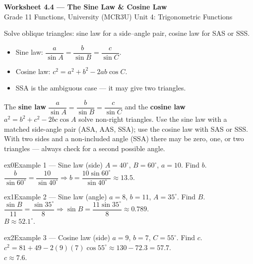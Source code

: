 \documentclass[11pt]{article}
\begin{document}
\begin{center}
{\LARGE\bfseries\color{titleblue}Worksheet 4.4 --- The Sine Law \& Cosine Law}\\[2pt]
{\small Grade 11 Functions, University (MCR3U) \textperiodcentered{} Unit 4: Trigonometric Functions}
\end{center}

\begin{ideabox}
Solve oblique triangles: sine law for a side–angle pair, cosine law for SAS or SSS.
\begin{itemize}[leftmargin=*,itemsep=2pt]
  \item Sine law: $\dfrac{a}{\sin A}=\dfrac{b}{\sin B}=\dfrac{c}{\sin C}$.
  \item Cosine law: $c^2=a^2+b^2-2ab\cos C$.
  \item SSA is the ambiguous case — it may give two triangles.
\end{itemize}
\end{ideabox}

\begin{learnbox}
The \textbf{sine law} $\dfrac{a}{\sin A}=\dfrac{b}{\sin B}=\dfrac{c}{\sin C}$ and the \textbf{cosine law} $a^2=b^2+c^2-2bc\cos A$ solve non-right triangles.
Use the sine law with a matched side-angle pair (ASA, AAS, SSA); use the cosine law with SAS or SSS.
With two sides and a non-included angle (SSA) there may be zero, one, or two triangles — always check for a second possible angle.
\end{learnbox}


\begin{example}{ex0}{Example 1 --- Sine law (side)}
$A=40^\circ$, $B=60^\circ$, $a=10$. Find $b$.\soln $\dfrac{b}{\sin60^\circ}=\dfrac{10}{\sin40^\circ}\Rightarrow b=\dfrac{10\sin60^\circ}{\sin40^\circ}\approx13.5$.
\end{example}

\begin{example}{ex1}{Example 2 --- Sine law (angle)}
$a=8$, $b=11$, $A=35^\circ$. Find $B$.\soln $\dfrac{\sin B}{11}=\dfrac{\sin35^\circ}{8}\Rightarrow\sin B=\dfrac{11\sin35^\circ}{8}\approx0.789$. \\ $B\approx52.1^\circ$.
\end{example}

\begin{example}{ex2}{Example 3 --- Cosine law (side)}
$a=9$, $b=7$, $C=55^\circ$. Find $c$.\soln $c^2=81+49-2(9)(7)\cos55^\circ\approx130-72.3=57.7$. \\ $c\approx7.6$.
\end{example}
\end{document}
